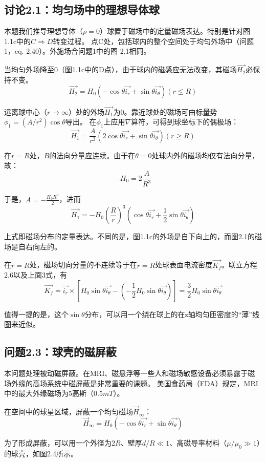 \subsection{讨论2.1：均匀场中的理想导体球}
本题我们推导理想导体（$\rho=0$）球置于磁场中的定量磁场表达。特别是针对图 1.1c中的$C\Rightarrow D$转变过程。
点C处，包括球内的整个空间处于均匀外场中（问题1，eq. 2.40）。外施场合问题1中的图 2.1相同。

当均匀外场降至$0$（图1.1c中的D点），由于球内的磁感应无法改变，其磁场$\vec{H_2}$必保持不变。
$$
\vec{H_2}=H_0 (-\cos\theta \vec{i_r}+\sin\theta \vec{i_\theta})  (r\le R)
$$

远离球中心（$r\rightarrow \infty$）处的外场$\vec{H_1}$为0。靠近球处的磁场可由标量势$\phi_1=(A/r^2)\cos\theta$导出。
在$\phi_1$上应用$\nabla$算符，可得到球坐标下的偶极场：
$$
\vec{H_1}=\frac{A}{r^3}(2\cos\theta \vec{i_r}+\sin\theta \vec{i_\theta})  (r\ge R)
$$

在$r=R$处，$B$的法向分量应连续。由于在$\theta=0$处球内外的磁场均仅有法向分量，故：
$$
-H_0=2\frac{A}{R^3}
$$

于是，$A=-\frac{H_0 R^3}{2}$，进而
$$
\vec{H_1}=-H_0(\frac{R}{r})^3 (\cos\theta \vec{i_r}+\frac{1}{2}\sin\theta \vec{i_\theta})
$$

上式即磁场分布的定量表达。不同的是，图1.1c的外场是自下向上的，而图2.1的磁场是自右向左的。

在$r=R$处，磁场切向分量的不连续等于在$r=R$处球表面电流密度$\vec{K_f}$。联立方程2.6以及上面3式，有
\begin{equation}
  \vec{K_f}=\vec{i_r}\times [H_0 \sin\theta \vec{i_\theta}-(-\frac{1}{2}H_0 \sin\theta \vec{i_\theta})]=\frac{3}{2}H_0\sin\theta\vec{i_\theta}
\end{equation}

值得一提的是，这个$\sin\theta$分布，可以用一个绕在球上的在z轴均匀匝密度的“薄”线圈来近似。


\subsection{问题2.3：球壳的磁屏蔽}
本问题处理被动磁屏蔽。在MRI、磁悬浮等一些人和磁场敏感设备必须暴露于磁场外缘的高场系统中磁屏蔽是非常重要的课题。
美国食药局（FDA）规定，MRI中的最大外缘磁场为5高斯（$0.5mT$）。

在空间中的球星区域，屏蔽一个均匀磁场$\vec{H}_\infty$：
$$
\vec{H}_\infty=H_0 (-\cos\theta \vec{i_r}+\sin\theta \vec{i_\theta})
$$

为了形成屏蔽，可以用一个外径为$2R$、壁厚$d/R\ll 1$、高磁导率材料（$\mu/\mu_0 \gg 1$）的球壳，如图2.4所示。

